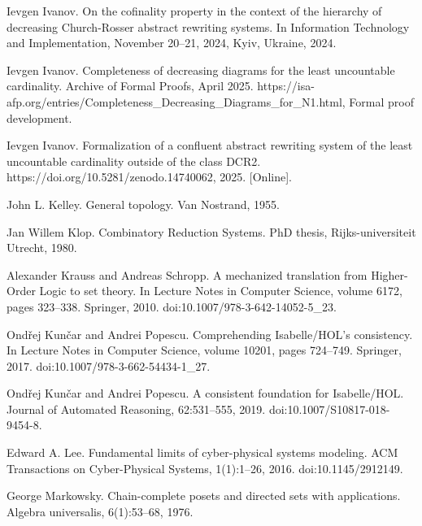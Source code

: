 \par\noindent  [20]  Ievgen Ivanov.  On the cofinality property in the context of the hierarchy of decreasing Church-Rosser abstract rewriting systems.  In Information Technology and Implementation, November 20–21, 2024, Kyiv, Ukraine, 2024.  
 
\par\noindent  [21]  Ievgen Ivanov.  Completeness of decreasing diagrams for the least uncountable cardinality.  Archive of Formal Proofs, April 2025.   https://isa-afp.org/entries/Completeness\_Decreasing\_Diagrams\_for\_N1.html, Formal proof development.  
 
\par\noindent  [22]  Ievgen Ivanov.  Formalization of a confluent abstract rewriting system of the least uncountable cardinality outside of the class DCR2.  https://doi.org/10.5281/zenodo.14740062, 2025.  [Online].  
 
\par\noindent  [23]  John L. Kelley.  General topology.  Van Nostrand, 1955.  
 
\par\noindent  [24]  Jan Willem Klop.  Combinatory Reduction Systems.  PhD thesis, Rijks-universiteit Utrecht, 1980.  
 
\par\noindent  [25]  Alexander Krauss and Andreas Schropp.  A mechanized translation from Higher-Order Logic to set theory.  In Lecture Notes in Computer Science, volume 6172, pages 323–338. Springer, 2010.  doi:10.1007/978-3-642-14052-5\_23.  
 
\par\noindent  [26]  Ondřej Kunčar and Andrei Popescu.  Comprehending Isabelle/HOL’s consistency.  In Lecture Notes in Computer Science, volume 10201, pages 724–749. Springer, 2017.  doi:10.1007/978-3-662-54434-1\_27.  
 
\par\noindent  [27]  Ondřej Kunčar and Andrei Popescu.  A consistent foundation for Isabelle/HOL.  Journal of Automated Reasoning, 62:531–555, 2019.  doi:10.1007/S10817-018-9454-8.  
 
\par\noindent  [28]  Edward A. Lee.  Fundamental limits of cyber-physical systems modeling.  ACM Transactions on Cyber-Physical Systems, 1(1):1–26, 2016.  doi:10.1145/2912149.  
 
\par\noindent  [29]  George Markowsky.  Chain-complete posets and directed sets with applications.  Algebra universalis, 6(1):53–68, 1976.  
 
